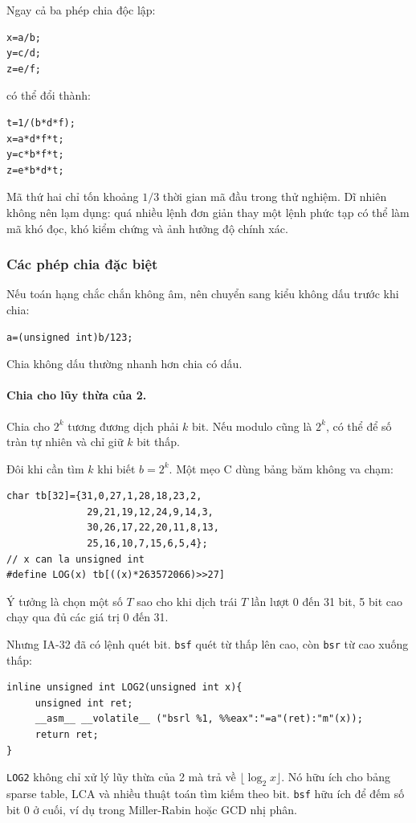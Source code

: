 \documentclass[11pt]{article}
\begin{document}
Ngay cả ba phép chia độc lập:
\begin{verbatim}
x=a/b;
y=c/d;
z=e/f;
\end{verbatim}
có thể đổi thành:
\begin{verbatim}
t=1/(b*d*f);
x=a*d*f*t;
y=c*b*f*t;
z=e*b*d*t;
\end{verbatim}
Mã thứ hai chỉ tốn khoảng \(1/3\) thời gian mã đầu trong thử nghiệm. Dĩ nhiên
không nên lạm dụng: quá nhiều lệnh đơn giản thay một lệnh phức tạp có thể làm
mã khó đọc, khó kiểm chứng và ảnh hưởng độ chính xác.

\subsubsection{Các phép chia đặc biệt}

Nếu toán hạng chắc chắn không âm, nên chuyển sang kiểu không dấu trước khi
chia:
\begin{verbatim}
a=(unsigned int)b/123;
\end{verbatim}
Chia không dấu thường nhanh hơn chia có dấu.

\paragraph{Chia cho lũy thừa của 2.}
Chia cho \(2^k\) tương đương dịch phải \(k\) bit. Nếu modulo cũng là
\(2^k\), có thể để số tràn tự nhiên và chỉ giữ \(k\) bit thấp.

Đôi khi cần tìm \(k\) khi biết \(b=2^k\). Một mẹo C dùng bảng băm không va
chạm:
\begin{verbatim}
char tb[32]={31,0,27,1,28,18,23,2,
              29,21,19,12,24,9,14,3,
              30,26,17,22,20,11,8,13,
              25,16,10,7,15,6,5,4};
// x can la unsigned int
#define LOG(x) tb[((x)*263572066)>>27]
\end{verbatim}
Ý tưởng là chọn một số \(T\) sao cho khi dịch trái \(T\) lần lượt 0 đến 31
bit, 5 bit cao chạy qua đủ các giá trị 0 đến 31.

Nhưng IA-32 đã có lệnh quét bit. \texttt{bsf} quét từ thấp lên cao, còn
\texttt{bsr} từ cao xuống thấp:
\begin{verbatim}
inline unsigned int LOG2(unsigned int x){
     unsigned int ret;
     __asm__ __volatile__ ("bsrl %1, %%eax":"=a"(ret):"m"(x));
     return ret;
}
\end{verbatim}
\texttt{LOG2} không chỉ xử lý lũy thừa của 2 mà trả về \(\lfloor\log_2 x\rfloor\).
Nó hữu ích cho bảng sparse table, LCA và nhiều thuật toán tìm kiếm theo bit.
\texttt{bsf} hữu ích để đếm số bit 0 ở cuối, ví dụ trong Miller-Rabin hoặc
GCD nhị phân.
\end{document}
